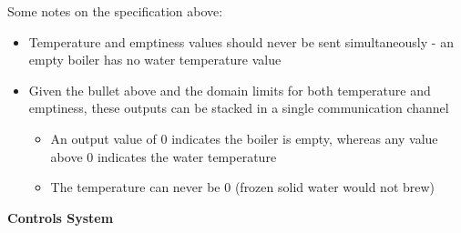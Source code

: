 \documentclass[10pt]{article}
\begin{document}
Some notes on the specification above:
\begin{itemize}
\item Temperature and emptiness values should never be sent simultaneously - an empty boiler has no water temperature value
\item Given the bullet above and the domain limits for both temperature and emptiness, these outputs can be stacked in a single communication channel
\begin{itemize}
\item An output value of 0 indicates the boiler is empty, whereas any value above 0 indicates the water temperature
\item The temperature can never be 0 (frozen solid water would not brew)
\end{itemize}
\end{itemize}


\textbf{Controls System}

\end{document}
